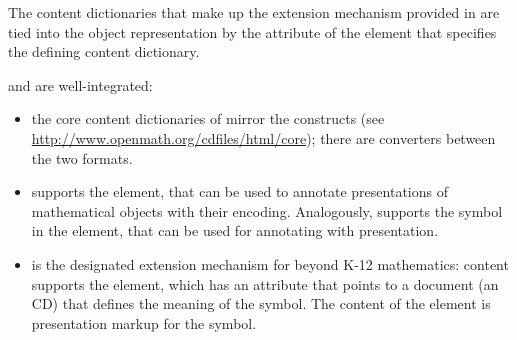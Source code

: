 The content dictionaries that make up the extension mechanism provided in
{\openmath} are tied into the object representation by the {}
attribute of the {} element that specifies the defining content
dictionary.

{\openmath} and {\mathml} are well-integrated:
\begin{itemize}
\item the core content dictionaries of {\openmath} mirror the {\mathml} constructs
  (see {\url{http://www.openmath.org/cdfiles/html/core}}); there are converters
  between the two formats.
\item {\mathml} supports the {} element, that can be used to
  annotate {\mathml} presentations of mathematical objects with their {\openmath}
  encoding. Analogously, {\openmath} supports the {} symbol in
  the {} element, that can be used for annotating with {\mathml}
  presentation.
\item {\openmath} is the designated extension mechanism for {\mathml} beyond K-12
  mathematics: content {\mathml} supports the {} element, which
  has an attribute {} that points to a document (an
  {\openmath} CD) that defines the meaning of the symbol. The content of the
  {} element is {\mathml} presentation markup for the symbol.
\end{itemize}

